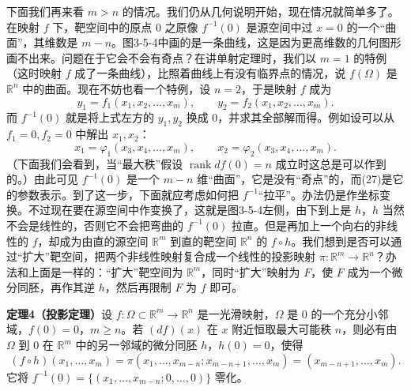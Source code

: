 下面我们再来看 $m>n$ 的情况。我们仍从几何说明开始，现在情况就简单多了。在映射 $f$ 下，靶空间中的原点 $0$ 之原像 $f^{-1}(0)$ 是源空间中过 $x=0$ 的一个“曲面”，其维数是 $m-n$。图3-5-4中画的是一条曲线，这是因为更高维数的几何图形画不出来。问题在于它会不会有奇点？在讲单射定理时，我们以 $m=1$ 的特例（这时映射 $f$ 成了一条曲线），比照着曲线上有没有临界点的情况，说 $f(\Omega)$ 是 $\mathbb R^n$ 中的曲面。现在不妨也看一个特例，设 $n=2$，于是映射 $f$ 成为
\begin{equation}
 y_1=f_1(x_1,x_2,\ldots,x_m),
 \qquad
 y_2=f_2(x_1,x_2,\ldots,x_m).
 \tag{26}
\end{equation}
而 $f^{-1}(0)$ 就是将上式左方的 $y_1,y_2$ 换成 $0$，并求其全部解而得。例如设可以从 $f_1=0,f_2=0$ 中解出 $x_1,x_2$：
\begin{equation}
 x_1=\varphi_1(x_3,x_4,\ldots,x_m),
 \qquad
 x_2=\varphi_2(x_3,x_4,\ldots,x_m).
 \tag{27}
\end{equation}
（下面我们会看到，当“最大秩”假设 $\operatorname{rank}df(0)=n$ 成立时这总是可以作到的。）由此可见 $f^{-1}(0)$ 是一个 $m-n$ 维“曲面”，它是没有“奇点”的，而(27)是它的参数表示。到了这一步，下面就应考虑如何把 $f^{-1}$“拉平”。办法仍是作坐标变换。不过现在要在源空间中作变换了，这就是图3-5-4左侧，由下到上是 $h$，$h$ 当然不会是线性的，否则它不会把弯曲的 $f^{-1}(0)$ 拉直。但是再加上一个向右的非线性的 $f$，却成为由直的源空间 $\mathbb R^m$ 到直的靶空间 $\mathbb R^n$ 的 $f\circ h$。我们想到是否可以通过“扩大”靶空间，把两个非线性映射复合成一个线性的投影映射 $\pi:\mathbb R^m\to\mathbb R^n$？办法和上面是一样的：“扩大”靶空间为 $\mathbb R^m$，同时“扩大”映射为 $F$，使 $F$ 成为一个微分同胚，再作其逆 $h$，然后再限制 $F$ 为 $f$ 即可。

\noindent\textbf{定理4（投影定理）}\quad 设 $f:\Omega\subset\mathbb R^m\to\mathbb R^n$ 是一光滑映射，$\Omega$ 是 $0$ 的一个充分小邻域，$f(0)=0$，$m\ge n$。若 $(df)(x)$ 在 $x$ 附近恒取最大可能秩 $n$，则必有由 $\Omega$ 到 $0$ 在 $\mathbb R^m$ 中的另一邻域的微分同胚 $h$，$h(0)=0$，使得
\begin{equation}
 (f\circ h)(x_1,\ldots,x_m)
 =\pi(x_1,\ldots,x_{m-n};x_{m-n+1},\ldots,x_m)
 =(x_{m-n+1},\ldots,x_m).
 \tag{28}
\end{equation}
它将 $f^{-1}(0)=\{(x_1,\ldots,x_{m-n};0,\ldots,0)\}$ 零化。

